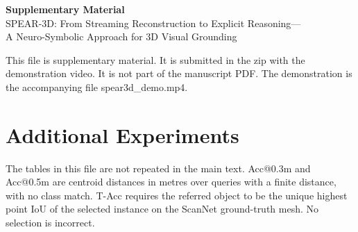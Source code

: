 \documentclass[10pt,letterpaper]{article}
\begin{document}
\begin{center}
{\large\bfseries Supplementary Material}\\[0.55em]
{\normalsize SPEAR-3D: From Streaming Reconstruction to Explicit Reasoning---\\
A Neuro-Symbolic Approach for 3D Visual Grounding}
\end{center}
\vspace{0.15em}
\thispagestyle{fancy}

\noindent
This file is supplementary material.
It is submitted in the zip with the demonstration video.
It is not part of the manuscript PDF.
The demonstration is the accompanying file spear3d\_demo.mp4.

\section{Additional Experiments}
The tables in this file are not repeated in the main text.
Acc@0.3m and Acc@0.5m are centroid distances in metres over queries with a finite distance, with no class match.
T-Acc requires the referred object to be the unique highest point IoU of the selected instance on the ScanNet ground-truth mesh.
No selection is incorrect.
\end{document}
